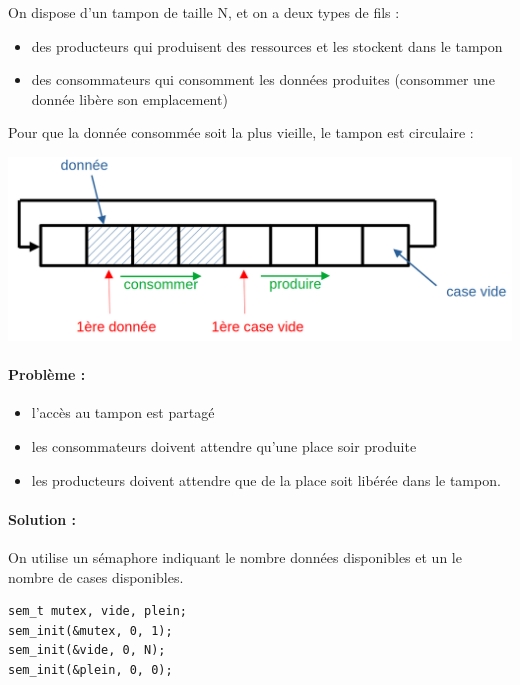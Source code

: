 \begin{appl} \normalfont
	On dispose d'un tampon de taille N, et on a deux types de fils : \begin{itemize}
		\item des producteurs qui produisent des ressources et les stockent dans le tampon
		\item des consommateurs qui consomment les données produites (consommer une donnée libère son emplacement)
	\end{itemize}
	
	Pour que la donnée consommée soit la plus vieille, le tampon est circulaire :
	\begin{center}
		\includegraphics[width=0.7\linewidth]{lecon/18-fil/prod-cons.png}
	\end{center}
	
	\paragraph{Problème :} \begin{itemize}
		\item l'accès au tampon est partagé
		\item les consommateurs doivent attendre qu'une place soir produite
		\item les producteurs doivent attendre que de la place soit libérée dans le tampon.
	\end{itemize}
	
	\paragraph{Solution :} On utilise un sémaphore indiquant le nombre données disponibles et un le nombre de cases disponibles.
	
	\begin{lstlisting}[style=CStyle]
sem_t mutex, vide, plein;
sem_init(&mutex, 0, 1);
sem_init(&vide, 0, N);
sem_init(&plein, 0, 0);\end{lstlisting}


\end{appl}
